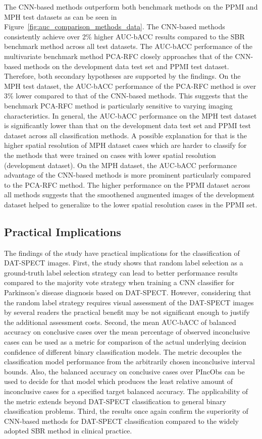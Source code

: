 The CNN-based methods outperform both benchmark methods on the PPMI and MPH test datasets 
as can be seen in Figure~\ref{fig:auc_comparison_methods_data}.
The CNN-based methods consistently achieve over 2\% higher AUC-bACC results compared to the SBR benchmark method
across all test datasets.
The AUC-bACC performance of the multivariate benchmark method PCA-RFC closely approaches that of the CNN-based methods 
on the development data test set and PPMI test dataset.
Therefore, both secondary hypotheses are supported by the findings.
On the MPH test dataset, the AUC-bACC performance of the PCA-RFC method is over 3\% lower
compared to that of the CNN-based methods.
This suggests that the benchmark PCA-RFC method is particularly sensitive to varying imaging characteristics.
In general, the AUC-bACC performance on the MPH test dataset is significantly lower 
than that on the development data test set and PPMI test dataset across all classification methods.
A possible explanation for that is the higher spatial resolution of MPH dataset cases
which are harder to classify for the methods that were trained on cases with lower spatial resolution (development dataset).
On the MPH dataset, the AUC-bACC performance advantage of the CNN-based methods is more prominent 
particularly compared to the PCA-RFC method.
The higher performance on the PPMI dataset across all methods suggests that the smoothened augmented images
of the development dataset helped to generalize to the lower spatial resolution cases in the PPMI set.


\subsection{Practical Implications}

The findings of the study have practical implications for the classification of DAT-SPECT images.
First, the study shows that random label selection as a ground-truth label selection strategy 
can lead to better performance results compared to the majority vote strategy 
when training a CNN classifier for Parkinson's disease diagnosis based on DAT-SPECT.
However, considering that the random label strategy requires visual assessment of the DAT-SPECT images by several readers 
the practical benefit may be not significant enough to justify the additional assessment costs.
Second, the mean AUC-bACC of balanced accuracy on conclusive cases over the mean percentage of observed inconclusive cases
can be used as a metric for comparison of the actual underlying decision confidence of 
different binary classification models.
The metric decouples the classification model performance from the arbitrarily chosen inconclusive interval bounds.
Also, the balanced accuracy on conclusive cases over PIncObs can be used to decide for that model which 
produces the least relative amount of inconclusive cases for a specified target balanced accuracy.
The applicability of the metric extends beyond DAT-SPECT classification to general binary classification problems.
Third, the results once again confirm the superiority of CNN-based methods for DAT-SPECT classification compared to the
widely adopted SBR method in clinical practice.


